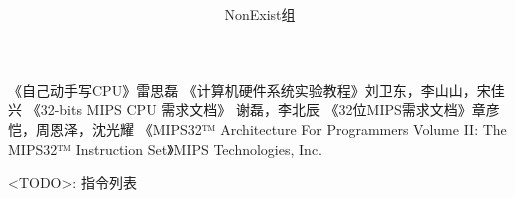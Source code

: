 

\title{ \\ }
\author{NonExist组}

\maketitle
\tableofcontents









\begin{thebibliography}{9}
     《自己动手写CPU》雷思磊
     《计算机硬件系统实验教程》刘卫东，李山山，宋佳兴
     《32-bits MIPS CPU 需求文档》 谢磊，李北辰
     《32位MIPS需求文档》章彦恺，周恩泽，沈光耀
     《MIPS32™ Architecture For Programmers Volume II: The MIPS32™ Instruction Set》MIPS Technologies, Inc.
\end{thebibliography}

<TODO>: 指令列表


